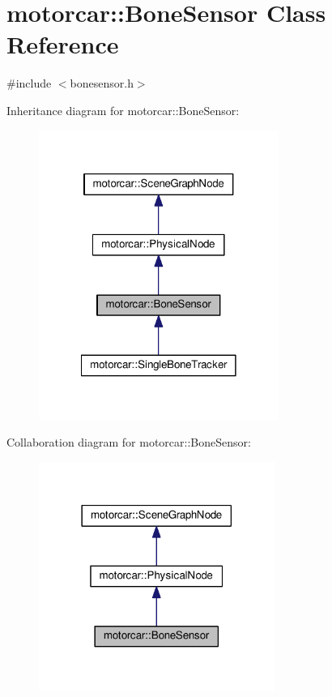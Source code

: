 \hypertarget{classmotorcar_1_1BoneSensor}{\section{motorcar\-:\-:Bone\-Sensor Class Reference}
\label{classmotorcar_1_1BoneSensor}
}


{\ttfamily \#include $<$bonesensor.\-h$>$}



Inheritance diagram for motorcar\-:\-:Bone\-Sensor\-:
\nopagebreak
\begin{figure}[H]
\begin{center}
\leavevmode
\includegraphics[width=222pt]{classmotorcar_1_1BoneSensor__inherit__graph}
\end{center}
\end{figure}


Collaboration diagram for motorcar\-:\-:Bone\-Sensor\-:
\nopagebreak
\begin{figure}[H]
\begin{center}
\leavevmode
\includegraphics[width=218pt]{classmotorcar_1_1BoneSensor__coll__graph}
\end{center}
\end{figure}
